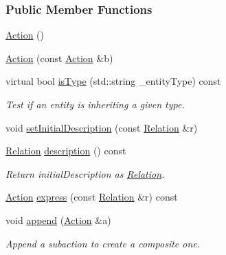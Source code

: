 \subsubsection*{Public Member Functions}
\begin{DoxyCompactItemize}
\item 
\hyperlink{group__icubclient__representations_a4f457ccfc8336b565cadca56b36e0271}{Action} ()
\item 
\hyperlink{group__icubclient__representations_a97702e22855a0b37743229d444cd0e95}{Action} (const \hyperlink{group__icubclient__representations_classicubclient_1_1Action}{Action} \&b)
\item 
virtual bool \hyperlink{group__icubclient__representations_a928f5814d5160e14157391cd85c0cbd0}{is\+Type} (std\+::string \+\_\+entity\+Type) const
\begin{DoxyCompactList}\small\item\em Test if an entity is inheriting a given type. \end{DoxyCompactList}\item 
void \hyperlink{group__icubclient__representations_a5b8e483eea56d34bc0724f469410580b}{set\+Initial\+Description} (const \hyperlink{group__icubclient__representations_classicubclient_1_1Relation}{Relation} \&r)
\item 
\hyperlink{group__icubclient__representations_classicubclient_1_1Relation}{Relation} \hyperlink{group__icubclient__representations_adbf6f29ba5b1111e1e8e28391badbda3}{description} () const
\begin{DoxyCompactList}\small\item\em Return initial\+Description as \hyperlink{group__icubclient__representations_classicubclient_1_1Relation}{Relation}. \end{DoxyCompactList}\item 
\hyperlink{group__icubclient__representations_classicubclient_1_1Action}{Action} \hyperlink{group__icubclient__representations_a9974e0796b2b1d647c3670a9adaf306d}{express} (const \hyperlink{group__icubclient__representations_classicubclient_1_1Relation}{Relation} \&r) const
\item 
void \hyperlink{group__icubclient__representations_a1d7d32ec1d32736fc22c6fb78c653c5b}{append} (\hyperlink{group__icubclient__representations_classicubclient_1_1Action}{Action} \&a)
\begin{DoxyCompactList}\small\item\em Append a subaction to create a composite one. \end{DoxyCompactList}\item 

\end{DoxyCompactItemize}
